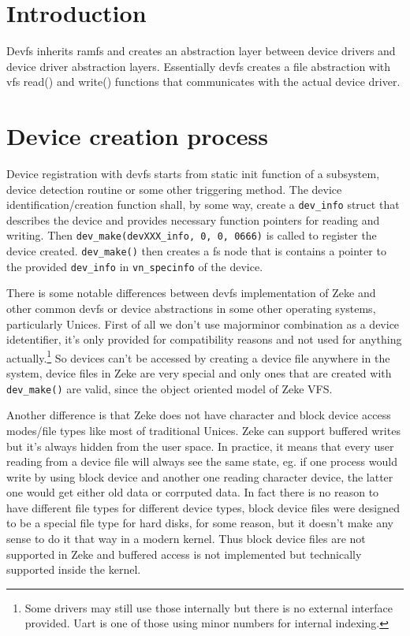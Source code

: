 \section{Introduction}

Devfs inherits ramfs and creates an abstraction layer between device drivers
and device driver abstraction layers. Essentially devfs creates a file
abstraction with vfs read() and write() functions that communicates with the
actual device driver.

\section{Device creation process}

Device registration with devfs starts from static init function of a subsystem,
device detection routine or some other triggering method. The device
identification/creation function shall, by some way, create a \verb+dev_info+
struct that describes the device and provides necessary function pointers for
reading and writing. Then \verb+dev_make(devXXX_info, 0, 0, 0666)+ is called
to register the device created. \verb+dev_make()+ then creates a fs node that is
contains a pointer to the provided \verb+dev_info+ in \verb+vn_specinfo+ of the
device.

There is some notable differences between devfs implementation of Zeke and other
common devfs or device abstractions in some other operating systems,
particularly Unices. First of all we don't use majorminor combination as a
device idetentifier, it's only provided for compatibility reasons and not used
for anything actually.\footnote{Some drivers may still use those internally but
there is no external interface provided. Uart is one of those using minor
numbers for internal indexing.} So devices can't be accessed by creating
a device file anywhere in the system, device files in Zeke are very special and
only ones that are created with \verb+dev_make()+ are valid, since the object
oriented model of Zeke VFS.

Another difference is that Zeke does not have character and block device
access modes/file types like most of traditional Unices. Zeke can support
buffered writes but it's always hidden from the user space. In practice,
it means that every user reading from a device file will always see the
same state, eg. if one process would write by using block device and another
one reading character device, the latter one would get either old data or
corrputed data. In fact there is no reason to have different file types for
different device types, block device files were designed to be a special file
type for hard disks, for some reason, but it doesn't make any sense to do it
that way in a modern kernel.\cite{Kamp:rethinkdev} Thus block device files are
not supported in Zeke and buffered access is not implemented but technically
supported inside the kernel.

